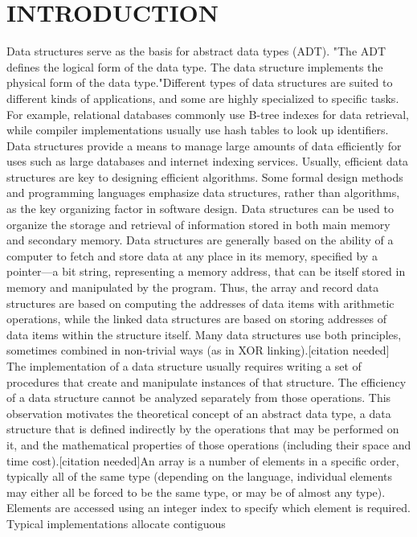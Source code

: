 \documentclass{article}
\begin{document}
\section*{INTRODUCTION}
Data structures serve as the basis for abstract data
types (ADT). "The ADT defines the logical form of
the data type. The data structure implements the
physical form of the data type."Different types of data
structures are suited to different kinds of applications,
and some are highly specialized to specific tasks. For
example, relational databases commonly use B-tree
indexes for data retrieval, while compiler
implementations usually use hash tables to look up
identifiers. Data structures provide a means to manage
large amounts of data efficiently for uses such as large
databases and internet indexing services. Usually,
efficient data structures are key to designing efficient
algorithms. Some formal design methods and
programming languages emphasize data structures,
rather than algorithms, as the key organizing factor in
software design. Data structures can be used to
organize the storage and retrieval of information
stored in both main memory and secondary memory.
Data structures are generally based on the ability of a
computer to fetch and store data at any place in its
memory, specified by a pointer—a bit string,
representing a memory address, that can be itself
stored in memory and manipulated by the program.
Thus, the array and record data structures are based on
computing the addresses of data items with arithmetic
operations, while the linked data structures are based
on storing addresses of data items within the structure
itself. Many data structures use both principles,
sometimes combined in non-trivial ways (as in XOR
linking).[citation needed]
The implementation of a data structure usually
requires writing a set of procedures that create and
manipulate instances of that structure. The efficiency
of a data structure cannot be analyzed separately from
those operations. This observation motivates the
theoretical concept of an abstract data type, a data
structure that is defined indirectly by the operations
that may be performed on it, and the mathematical
properties of those operations (including their space
and time cost).[citation needed]An array is a number
of elements in a specific order, typically all of the
same type (depending on the language, individual
elements may either all be forced to be the same type,
or may be of almost any type). Elements are accessed
using an integer index to specify which element is
required. Typical implementations allocate contiguous
\end{document}
